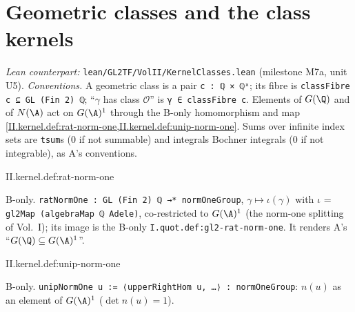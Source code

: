 \section{Geometric classes and the class kernels}\label{sec:kernel-classes}

\noindent\emph{Lean counterpart:} \texttt{lean/GL2TF/VolII/KernelClasses.lean} (milestone M7a, unit U5). \emph{Conventions.} A geometric class is a pair
\texttt{c : ℚ × ℚˣ}; its fibre is \texttt{classFibre c ⊆ GL (Fin 2) ℚ}; ``$\gamma$ has class $\mathcal O$'' is \texttt{γ ∈ classFibre c}. Elements of $G(\Q)$ and of
$N(\A)$ act on $G(\A)^1$ through the B-only homomorphism and map \cref{II.kernel.def:rat-norm-one,II.kernel.def:unip-norm-one}. Sums over infinite index sets are
\texttt{tsum}s ($0$ if not summable) and integrals Bochner integrals ($0$ if not integrable), as A's conventions.

\begin{definition}
\bonly
{}
\end{definition}
\begin{tfformal}{II.kernel.def:rat-norm-one}
\begin{tffidelity}
B-only. \texttt{ratNormOne : GL (Fin 2) ℚ →* normOneGroup}, $\gamma\mapsto\iota(\gamma)$ with $\iota$ = \texttt{gl2Map (algebraMap ℚ Adele)}, co-restricted to $G(\A)^1$ (the norm-one splitting of Vol.~I); its image is the B-only \texttt{I.quot.def:gl2-rat-norm-one}. It renders A's ``$G(\Q)\subseteq G(\A)^1$''.
\end{tffidelity}
\end{tfformal}

\begin{definition}
\bonly
{}
\end{definition}
\begin{tfformal}{II.kernel.def:unip-norm-one}
\begin{tffidelity}
B-only. \texttt{unipNormOne u := ⟨upperRightHom u, …⟩ : normOneGroup}: $n(u)$ as an element of $G(\A)^1$ ($\det n(u)=1$).
\end{tffidelity}
\end{tfformal}

